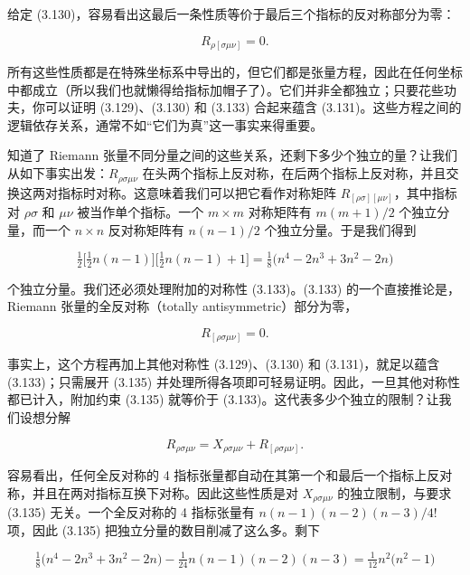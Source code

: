 给定 (3.130)，容易看出这最后一条性质等价于最后三个指标的反对称部分为零：

\begin{equation*}
R_{\rho[\sigma\mu\nu]} = 0. \tag{3.133}
\end{equation*}

所有这些性质都是在特殊坐标系中导出的，但它们都是张量方程，因此在任何坐标中都成立（所以我们也就懒得给指标加帽子了）。它们并非全都独立；只要花些功夫，你可以证明 (3.129)、(3.130) 和 (3.133) 合起来蕴含 (3.131)。这些方程之间的逻辑依存关系，通常不如“它们为真”这一事实来得重要。

知道了 Riemann 张量不同分量之间的这些关系，还剩下多少个独立的量？让我们从如下事实出发：$R_{\rho\sigma\mu\nu}$ 在头两个指标上反对称，在后两个指标上反对称，并且交换这两对指标时对称。这意味着我们可以把它看作对称矩阵 $R_{[\rho\sigma][\mu\nu]}$，其中指标对 $\rho\sigma$ 和 $\mu\nu$ 被当作单个指标。一个 $m\times m$ 对称矩阵有 $m(m+1)/2$ 个独立分量，而一个 $n\times n$ 反对称矩阵有 $n(n-1)/2$ 个独立分量。于是我们得到

\begin{equation*}
\tfrac{1}{2}\Big[\tfrac{1}{2}n(n-1)\Big]\Big[\tfrac{1}{2}n(n-1)+1\Big] = \tfrac{1}{8}\big(n^4 - 2n^3 + 3n^2 - 2n\big) \tag{3.134}
\end{equation*}

个独立分量。我们还必须处理附加的对称性 (3.133)。(3.133) 的一个直接推论是，Riemann 张量的全反对称（totally antisymmetric）部分为零，

\begin{equation*}
R_{[\rho\sigma\mu\nu]} = 0. \tag{3.135}
\end{equation*}

事实上，这个方程再加上其他对称性 (3.129)、(3.130) 和 (3.131)，就足以蕴含 (3.133)；只需展开 (3.135) 并处理所得各项即可轻易证明。因此，一旦其他对称性都已计入，附加约束 (3.135) 就等价于 (3.133)。这代表多少个独立的限制？让我们设想分解

\begin{equation*}
R_{\rho\sigma\mu\nu} = X_{\rho\sigma\mu\nu} + R_{[\rho\sigma\mu\nu]}. \tag{3.136}
\end{equation*}

容易看出，任何全反对称的 4 指标张量都自动在其第一个和最后一个指标上反对称，并且在两对指标互换下对称。因此这些性质是对 $X_{\rho\sigma\mu\nu}$ 的独立限制，与要求 (3.135) 无关。一个全反对称的 4 指标张量有 $n(n-1)(n-2)(n-3)/4!$ 项，因此 (3.135) 把独立分量的数目削减了这么多。剩下

\begin{equation*}
\tfrac{1}{8}\big(n^4 - 2n^3 + 3n^2 - 2n\big) - \tfrac{1}{24}n(n-1)(n-2)(n-3) = \tfrac{1}{12}n^2\big(n^2 - 1\big) \tag{3.137}
\end{equation*}

